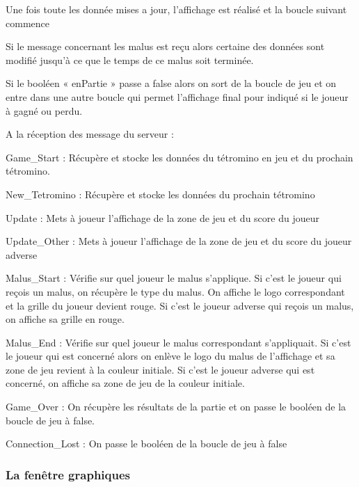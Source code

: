 \documentclass[a4paper, 12pt]{article}
\begin{document}
		Une fois toute les donnée mises a jour, l’affichage est réalisé et la boucle suivant commence

		Si le message concernant les malus est reçu alors certaine des données sont modifié jusqu’à ce que le temps de ce malus soit terminée.

		Si le booléen « enPartie » passe a false alors on sort de la boucle de jeu et on entre dans une autre boucle qui permet l’affichage final pour indiqué si le joueur à gagné ou perdu.

		A la réception des message du serveur :

		Game\_Start : 
		    Récupère et stocke les données du tétromino en jeu et du prochain tétromino.

		New\_Tetromino :
		    Récupère et stocke les données du prochain tétromino

		Update : 
		    Mets à joueur l’affichage de la zone de jeu et du score du joueur

		Update\_Other :
		    Mets à joueur l’affichage de la zone de jeu et du score du joueur adverse

		Malus\_Start : 
		    Vérifie sur quel joueur le malus s’applique.
		    Si c’est le joueur qui reçois un malus, on récupère le type du malus. On affiche le logo correspondant et la grille du joueur devient rouge.
		    Si c’est le joueur adverse qui reçois un malus, on affiche sa grille en rouge.

		Malus\_End :
		    Vérifie sur quel joueur le malus correspondant s’appliquait.
		    Si c’est le joueur qui est concerné alors on enlève le logo du malus de l’affichage et sa zone de jeu revient à la couleur initiale.
		    Si c’est le joueur adverse qui est concerné, on affiche sa zone de jeu de la couleur initiale.

		Game\_Over :
		    On récupère les résultats de la partie et on passe le booléen de la boucle de jeu à false.

		Connection\_Lost : 
		    On passe le booléen de la boucle de jeu à false
		    

		\subsubsection{La fenêtre graphiques}
\end{document}
